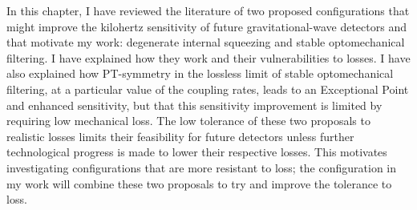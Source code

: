 In this chapter, I have reviewed the literature of two proposed configurations that might improve the kilohertz sensitivity of future gravitational-wave detectors and that motivate my work: degenerate internal squeezing and stable optomechanical filtering.
I have explained how they work and their vulnerabilities to losses.
I have also explained how PT-symmetry in the lossless limit of stable optomechanical filtering, at a particular value of the coupling rates, leads to an Exceptional Point and enhanced sensitivity, but that this sensitivity improvement is limited by requiring low mechanical loss.
The low tolerance of these two proposals to realistic losses limits their feasibility for future detectors unless further technological progress is made to lower their respective losses. This motivates investigating configurations that are more resistant to loss; the configuration in my work will combine these two proposals to try and improve the tolerance to loss.


